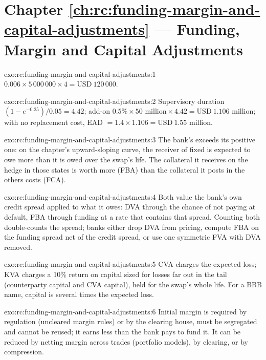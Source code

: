 \section*{Chapter \ref{ch:rc:funding-margin-and-capital-adjustments} --- Funding, Margin and Capital Adjustments}

\begin{solution}{exo:rc:funding-margin-and-capital-adjustments:1}
$0.006\times5\,000\,000\times4 = \text{USD}~120\,000$.
\end{solution}

\begin{solution}{exo:rc:funding-margin-and-capital-adjustments:2}
Supervisory duration $(1-e^{-0.25})/0.05 = 4.42$; add-on $0.5\%\times50\text{ million}\times4.42 =
\text{USD}~1.106$ million; with no replacement cost, EAD $= 1.4\times1.106 = \text{USD}~1.55$ million.
\end{solution}

\begin{solution}{exo:rc:funding-margin-and-capital-adjustments:3}
The bank's  exceeds its positive one: on the chapter's upward-sloping
curve, the receiver of fixed is expected to owe more than it is owed over the swap's life. The
collateral it receives on the hedge in those states is worth more (FBA) than the collateral it
posts in the others costs (FCA).
\end{solution}

\begin{solution}{exo:rc:funding-margin-and-capital-adjustments:4}
Both value the bank's own credit spread applied to what it owes: DVA through the chance of not
paying at default, FBA through funding at a rate that contains that spread. Counting both
double-counts the spread; banks either drop DVA from pricing, compute FBA on the funding spread
net of the credit spread, or use one symmetric FVA with DVA removed.
\end{solution}

\begin{solution}{exo:rc:funding-margin-and-capital-adjustments:5}
CVA charges the expected loss; KVA charges a 10\% return on capital sized for losses far out in
the tail (counterparty capital and CVA capital), held for the swap's whole life. For a BBB name,
capital is several times the expected loss.
\end{solution}

\begin{solution}{exo:rc:funding-margin-and-capital-adjustments:6}
Initial margin is required by regulation (uncleared margin rules) or by the clearing house,
must be segregated and cannot be reused; it earns less than the bank pays to fund it. It can be
reduced by netting margin across trades (portfolio models), by clearing, or by compression.
\end{solution}

